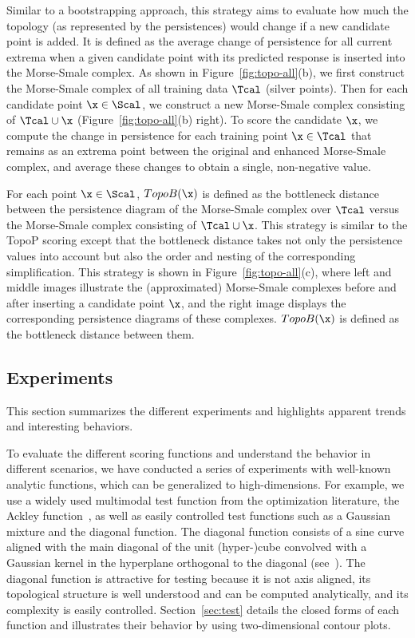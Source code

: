  Similar to a bootstrapping approach, this strategy aims to evaluate how much the topology (as represented by the persistences) would change if a new candidate point is added.
%
It is defined as the average change of persistence for all current extrema when a given candidate point with its predicted response is inserted into the Morse-Smale complex.
%
As shown in Figure~\ref{fig:topo-all}(b), we first construct the Morse-Smale complex of all training data $\Tcal$ (silver points).
%
Then for each candidate point $\x \in \Scal$, we construct a new Morse-Smale complex consisting of $\Tcal \cup \x$ (Figure~\ref{fig:topo-all}(b) right).
%
To score the candidate $\x$, we compute the change in persistence for each training point $\x \in \Tcal$ that remains as an extrema point between the original and enhanced Morse-Smale complex, and average these changes to obtain a single, non-negative value.

 For each point $\x \in \Scal$, $TopoB(\x)$ is defined as the bottleneck distance between the persistence diagram of the Morse-Smale complex over $\Tcal$ versus the Morse-Smale complex consisting of $\Tcal \cup \x$.
%
This strategy is similar to the TopoP scoring except that the bottleneck distance takes not only the persistence values into account but also the order and nesting of the corresponding simplification.
%
This strategy is shown in Figure~\ref{fig:topo-all}(c), where left and middle images illustrate the (approximated) Morse-Smale complexes before and after inserting a candidate point $\x$, and the right image displays the corresponding persistence diagrams of these complexes.
%
$TopoB(\x)$ is defined as the bottleneck distance between them.

\subsection{Experiments}
\label{sec:exp}

This section summarizes the different experiments and highlights apparent trends and interesting behaviors.

 To evaluate the different scoring functions and understand the behavior in different scenarios, we have conducted a series of experiments with well-known analytic functions, which can be generalized to high-dimensions.
%
For example, we use a widely used multimodal test function from the optimization literature, the Ackley function~\cite{Ackley1987}, as well as easily controlled test functions such as a Gaussian mixture and the diagonal function.
%
The diagonal function consists of a sine curve aligned with the main diagonal of the unit (hyper-)cube convolved with a Gaussian kernel in the hyperplane orthogonal to the diagonal (see~\cite{GerberBremerPascucci2010}).
%
The diagonal function is attractive for testing because it is not axis aligned, its topological structure is well understood and can be computed analytically, and its complexity is easily controlled.
%
Section~\ref{sec:test} details the closed forms of each function and illustrates their behavior by using two-dimensional contour plots.

